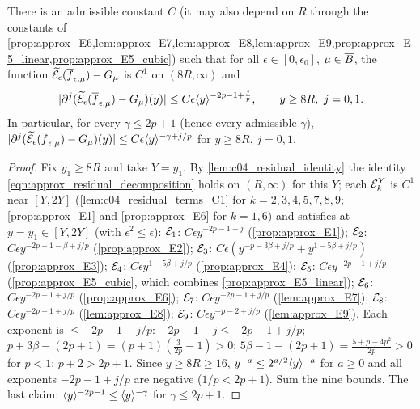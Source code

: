 \begin{proposition}
  \label{prop:approx_residual_positive}
  There is an admissible constant $C$ (it may also depend on $R$ through the constants of \cref{prop:approx_E6,lem:approx_E7,lem:approx_E8,lem:approx_E9,prop:approx_E5_linear,prop:approx_E5_cubic})
  such that for all $\epsilon\in[0,\epsilon_0]$, $\mu\in\overline{B}$, the function $\widetilde{\mathcal{E}}_\epsilon(\overline{f}_{\epsilon,\mu})-G_\mu$ is $C^1$ on $(8R,\infty)$ and
  \[
    |\partial^j(\widetilde{\mathcal{E}}_\epsilon(\overline{f}_{\epsilon,\mu})-G_\mu)(y)|\le C\epsilon\langle y \rangle^{-2p-1+\frac jp},\qquad y\ge8R,\ j=0,1 .
  \]
  In particular, for every $\gamma\le2p+1$ (hence every admissible $\gamma$),
  $|\partial^j(\widetilde{\mathcal{E}}_\epsilon(\overline{f}_{\epsilon,\mu})-G_\mu)(y)|\le C\epsilon\langle y \rangle^{-\gamma+j/p}$ for $y\ge8R$, $j=0,1$.
\end{proposition}
\begin{proof}
  Fix $y_1\ge8R$ and take $Y=y_1$. By \cref{lem:c04_residual_identity} the identity \eqref{eqn:approx_residual_decomposition} holds on $(R,\infty)$ for this
  $Y$; each $\mathcal{E}_k^Y$ is $C^1$ near $[Y,2Y]$ (\cref{lem:c04_residual_terms_C1} for $k=2,3,4,5,7,8,9$; \cref{prop:approx_E1}
  and \cref{prop:approx_E6} for $k=1,6$) and satisfies at $y=y_1\in[Y,2Y]$ (with $\epsilon^2\le\epsilon$):
  $\mathcal{E}_1$: $C\epsilon y^{-2p-1-j}$ (\cref{prop:approx_E1}); $\mathcal{E}_2$: $C\epsilon y^{-2p-1-\beta+j/p}$ (\cref{prop:approx_E2});
  $\mathcal{E}_3$: $C\epsilon(y^{-p-3\beta+j/p}+y^{1-5\beta+j/p})$ (\cref{prop:approx_E3}); $\mathcal{E}_4$: $C\epsilon y^{1-5\beta+j/p}$ (\cref{prop:approx_E4});
  $\mathcal{E}_5$: $C\epsilon y^{-2p-1+j/p}$ (\cref{prop:approx_E5_cubic}, which combines \cref{prop:approx_E5_linear}); $\mathcal{E}_6$: $C\epsilon y^{-2p-1+j/p}$ (\cref{prop:approx_E6});
  $\mathcal{E}_7$: $C\epsilon y^{-2p-1+j/p}$ (\cref{lem:approx_E7}); $\mathcal{E}_8$: $C\epsilon y^{-2p-1+j/p}$ (\cref{lem:approx_E8}); $\mathcal{E}_9$: $C\epsilon y^{-p-2+j/p}$ (\cref{lem:approx_E9}).
  Each exponent is $\le-2p-1+j/p$: $-2p-1-j\le-2p-1+j/p$; $p+3\beta-(2p+1)=(p+1)(\frac3{2p}-1)>0$;
  $5\beta-1-(2p+1)=\frac{5+p-4p^2}{2p}>0$ for $p<1$; $p+2>2p+1$. Since $y\ge8R\ge16$, $y^{-a}\le2^{a/2}\langle y \rangle^{-a}$ for $a\ge0$ and all exponents
  $-2p-1+j/p$ are negative ($1/p<2p+1$). Sum the nine bounds. The last claim: $\langle y \rangle^{-2p-1}\le\langle y \rangle^{-\gamma}$ for $\gamma\le2p+1$.
\end{proof}

